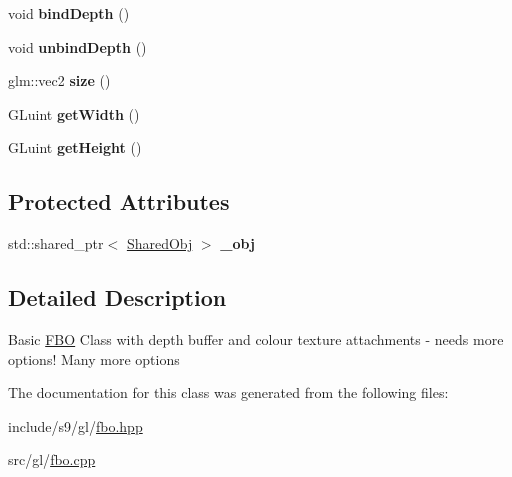 \begin{DoxyCompactItemize}
\item 
\hypertarget{classs9_1_1gl_1_1FBO_ab6ecb75558762badfa8b36fd2985ec48}{void {\bfseries bind\-Depth} ()}\label{classs9_1_1gl_1_1FBO_ab6ecb75558762badfa8b36fd2985ec48}

\item 
\hypertarget{classs9_1_1gl_1_1FBO_af8f11487eabd27072d1a2189537deb96}{void {\bfseries unbind\-Depth} ()}\label{classs9_1_1gl_1_1FBO_af8f11487eabd27072d1a2189537deb96}

\item 
\hypertarget{classs9_1_1gl_1_1FBO_a7e167bec508bd08b77c0fd1086b887af}{glm\-::vec2 {\bfseries size} ()}\label{classs9_1_1gl_1_1FBO_a7e167bec508bd08b77c0fd1086b887af}

\item 
\hypertarget{classs9_1_1gl_1_1FBO_a871216289af220e56d59b49ac788b588}{\-G\-Luint {\bfseries get\-Width} ()}\label{classs9_1_1gl_1_1FBO_a871216289af220e56d59b49ac788b588}

\item 
\hypertarget{classs9_1_1gl_1_1FBO_aa17e9cf870cf5eb0b2fb780482d1c0da}{\-G\-Luint {\bfseries get\-Height} ()}\label{classs9_1_1gl_1_1FBO_aa17e9cf870cf5eb0b2fb780482d1c0da}

\end{DoxyCompactItemize}
\subsection*{\-Protected \-Attributes}
\begin{DoxyCompactItemize}
\item 
\hypertarget{classs9_1_1gl_1_1FBO_a467391f5bd87d1dfaa68aff17c9647c9}{std\-::shared\-\_\-ptr$<$ \hyperlink{structs9_1_1gl_1_1FBO_1_1SharedObj}{\-Shared\-Obj} $>$ {\bfseries \-\_\-obj}}\label{classs9_1_1gl_1_1FBO_a467391f5bd87d1dfaa68aff17c9647c9}

\end{DoxyCompactItemize}


\subsection{\-Detailed \-Description}
\-Basic \hyperlink{classs9_1_1gl_1_1FBO}{\-F\-B\-O} \-Class with depth buffer and colour texture attachments  -\/ needs more options! \-Many more options 

\-The documentation for this class was generated from the following files\-:\begin{DoxyCompactItemize}
\item 
include/s9/gl/\hyperlink{fbo_8hpp}{fbo.\-hpp}\item 
src/gl/\hyperlink{fbo_8cpp}{fbo.\-cpp}\end{DoxyCompactItemize}
